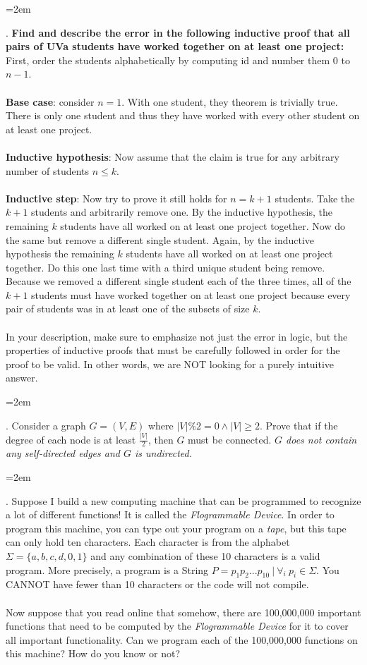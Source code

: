 \documentclass[12pt]{article}
\newcounter{quesnum}
\newcommand{\question}[2][??]{
\begin{list}{\labelitemi}{\leftmargin=2em}
\item [\arabic{quesnum}.] {} {#2}
\end{list}
\addtocounter{quesnum}{1}
}
\begin{document}
\question[3]{
\textbf{Find and describe the error in the following inductive proof that all pairs of UVa students have worked together on at least one project:} First, order the students alphabetically by computing id and number them $0$ to $n-1$.\\
\\
\textbf{Base case}: consider $n=1$. With one student, they theorem is trivially true. There is only one student and thus they have worked with every other student on at least one project.\\
\\
\textbf{Inductive hypothesis}: Now assume that the claim is true for any arbitrary number of students $n \leq k$.\\
\\
\textbf{Inductive step}: Now try to prove it still holds for $n=k+1$ students. Take the $k+1$ students and arbitrarily remove one. By the inductive hypothesis, the remaining $k$ students have all worked on at least one project together. Now do the same but remove a different single student. Again, by the inductive hypothesis the remaining $k$ students have all worked on at least one project together. Do this one last time with a third unique student being remove. Because we removed a different single student each of the three times, all of the $k+1$ students must have worked together on at least one project because every pair of students was in at least one of the subsets of size $k$.\\
\\
In your description, make sure to emphasize not just the error in logic, but the properties of inductive proofs that must be carefully followed in order for the proof to be valid. In other words, we are NOT looking for a purely intuitive answer.}

\vspace{12pt}


\question[3]{
Consider a graph $G=(V,E)$ where $|V| \% 2 = 0 \wedge |V| \geq 2$. Prove that if the degree of each node is at least $\frac{|V|}{2}$, then $G$ must be connected. \emph{$G$ does not contain any self-directed edges and $G$ is undirected.}
}

\vspace{12pt}




\question[3]{
Suppose I build a new computing machine that can be programmed to recognize a lot of different functions! It is called the \emph{Flogrammable Device}. In order to program this machine, you can type out your program on a \emph{tape}, but this tape can only hold ten characters. Each character is from the alphabet $\Sigma=\{a,b,c,d,0,1\}$ and any combination of these 10 characters is a valid program. More precisely, a program is a String $P = p_1p_2...p_{10} \ | \ \forall_i \ p_i \in \Sigma$. You CANNOT have fewer than 10 characters or the code will not compile.\\
\\
Now suppose that you read online that somehow, there are 100,000,000 important functions that need to be computed by the \emph{Flogrammable Device} for it to cover all important functionality. Can we program each of the 100,000,000 functions on this machine? How do you know or not?
}
\end{document}
